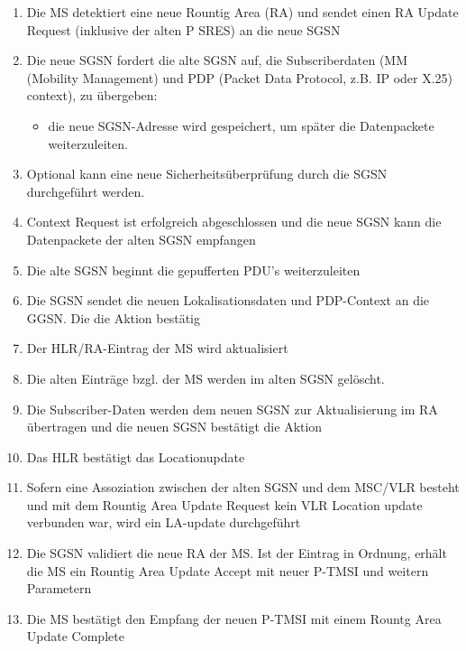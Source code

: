 \begin{minipage}{0.5 \linewidth}
\begin{enumerate}
\item Die MS detektiert eine neue Rountig Area (RA) und sendet einen RA Update Request (inklusive der alten P SRES) an die neue SGSN
\item Die neue SGSN fordert die alte SGSN auf, die Subscriberdaten (MM (Mobility Management) und PDP (Packet Data Protocol, z.B. IP oder X.25) context), zu übergeben:
\begin{itemize}
\item die neue SGSN-Adresse wird gespeichert, um später die Datenpackete weiterzuleiten.
\end{itemize}
\item Optional kann eine neue Sicherheitsüberprüfung durch die SGSN durchgeführt werden.
\item Context Request ist erfolgreich abgeschlossen und die neue SGSN kann die Datenpackete der alten SGSN empfangen
\item Die alte SGSN beginnt die gepufferten PDU's weiterzuleiten
\item Die SGSN sendet die neuen Lokalisationsdaten und PDP-Context an die GGSN. Die die Aktion bestätig
\item Der HLR/RA-Eintrag der MS wird aktualisiert
\item Die alten Einträge bzgl. der MS werden im alten SGSN gelöscht.
\item Die Subscriber-Daten werden dem neuen SGSN zur Aktualisierung im RA übertragen und die neuen SGSN bestätigt die Aktion
\item Das HLR bestätigt das Locationupdate
\item Sofern eine Assoziation zwischen der alten SGSN und dem MSC/VLR besteht und mit dem Rountig Area Update Request kein VLR Location update verbunden war, wird ein LA-update durchgeführt
\item Die SGSN validiert die neue RA der MS. Ist der Eintrag in Ordnung, erhält die MS ein Rountig Area Update Accept mit neuer P-TMSI und weitern Parametern
\item Die MS bestätigt den Empfang der neuen P-TMSI mit einem Rountg Area Update Complete
\end{enumerate}
\end{minipage}